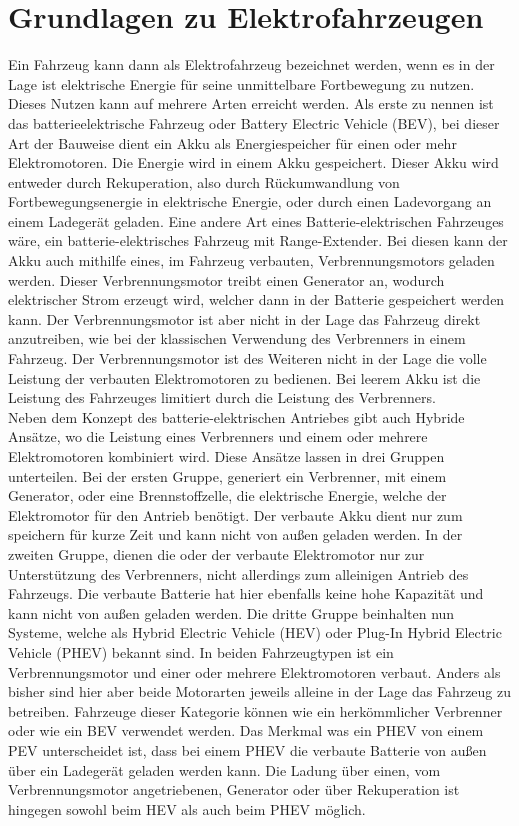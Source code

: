 \section{Grundlagen zu Elektrofahrzeugen}
Ein Fahrzeug kann dann als Elektrofahrzeug bezeichnet werden, wenn es in der Lage ist elektrische Energie für seine unmittelbare Fortbewegung zu nutzen. Dieses Nutzen kann auf mehrere Arten erreicht werden. Als erste zu nennen ist das batterieelektrische Fahrzeug oder Battery Electric Vehicle (BEV), bei dieser Art der Bauweise dient ein Akku als Energiespeicher für einen oder mehr Elektromotoren. Die Energie wird in einem Akku gespeichert. Dieser Akku wird entweder durch Rekuperation, also durch Rückumwandlung von Fortbewegungsenergie in elektrische Energie, oder durch einen Ladevorgang an einem Ladegerät geladen. Eine andere Art eines Batterie-elektrischen Fahrzeuges wäre, ein batterie-elektrisches Fahrzeug mit Range-Extender. Bei diesen kann der Akku auch mithilfe eines, im Fahrzeug verbauten, Verbrennungsmotors geladen werden. Dieser Verbrennungsmotor treibt einen Generator an, wodurch elektrischer Strom erzeugt wird, welcher dann in der Batterie gespeichert werden kann. Der Verbrennungsmotor ist aber nicht in der Lage das Fahrzeug direkt anzutreiben, wie bei der klassischen Verwendung des Verbrenners in einem Fahrzeug. Der Verbrennungsmotor ist des Weiteren nicht in der Lage die volle Leistung der verbauten Elektromotoren zu bedienen. Bei leerem Akku ist die Leistung des Fahrzeuges limitiert durch die Leistung des Verbrenners. \\
Neben dem Konzept des batterie-elektrischen Antriebes gibt auch Hybride Ansätze, wo die Leistung eines Verbrenners und einem oder mehrere Elektromotoren kombiniert wird. Diese Ansätze lassen in drei Gruppen unterteilen. Bei der ersten Gruppe, generiert ein Verbrenner, mit einem Generator, oder eine Brennstoffzelle, die elektrische Energie, welche der Elektromotor für den Antrieb benötigt. Der verbaute Akku dient nur zum speichern für kurze Zeit und kann nicht von außen geladen werden. In der zweiten Gruppe, dienen die oder der verbaute Elektromotor nur zur Unterstützung des Verbrenners, nicht allerdings zum alleinigen Antrieb des Fahrzeugs. Die verbaute Batterie hat hier ebenfalls keine hohe Kapazität und kann nicht von außen geladen werden. Die dritte Gruppe beinhalten nun Systeme, welche als Hybrid Electric Vehicle (HEV) oder Plug-In Hybrid Electric Vehicle (PHEV) bekannt sind. In beiden Fahrzeugtypen ist ein Verbrennungsmotor und einer oder mehrere Elektromotoren verbaut. Anders als bisher sind hier aber beide Motorarten jeweils alleine in der Lage das Fahrzeug zu betreiben. Fahrzeuge dieser Kategorie können wie ein herkömmlicher Verbrenner oder wie ein BEV verwendet werden. Das Merkmal was ein PHEV von einem PEV unterscheidet ist, dass bei einem PHEV die verbaute Batterie von außen über ein Ladegerät geladen werden kann. Die Ladung über einen, vom Verbrennungsmotor angetriebenen, Generator oder über Rekuperation ist hingegen sowohl beim HEV als auch beim PHEV möglich.\\
